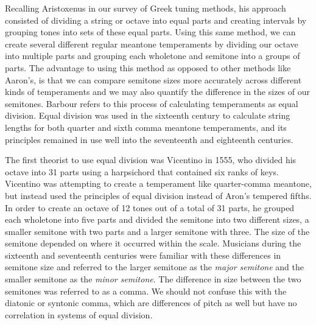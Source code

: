 Recalling Aristoxenus in our survey of Greek tuning methods, his approach consisted of
dividing a string or octave into equal parts and creating intervals by grouping tones into
sets of these equal parts. Using this same method, we can create several different regular
meantone temperaments by dividing our octave into multiple parts and grouping each
wholetone and semitone into a groups of parts. The advantage to using this method as
opposed to other methods like Aaron's, is that we can compare semitone sizes more
accurately across different kinds of temperaments and we may also quantify the difference
in the sizes of our semitones. Barbour refers to this process of calculating temperaments
as equal division. Equal division was used in the sixteenth century to calculate string
lengths for both quarter and sixth comma meantone temperaments, and its principles
remained in use well into the seventeenth and eighteenth centuries.

The first theorist to use equal division was Vicentino in 1555, who divided his octave
into 31 parts using a harpsichord that contained six ranks of keys. Vicentino was
attempting to create a temperament like quarter-comma meantone, but instead used the
principles of equal division instead of Aron's tempered fifths. In order to create an
octave of 12 tones out of a total of 31 parts, he grouped each wholetone into five
parts and divided the semitone into two different sizes, a smaller semitone with two
parts and a larger semitone with three.  The size of the semitone depended on where it
occurred within the scale. Musicians during the sixteenth and seventeenth centuries
were familiar with these differences in semitone size and referred to the larger
semitone as the \textit{major semitone} and the smaller semitone as the \textit{minor
semitone}.  The difference in size between the two semitones was referred to as a
comma.  We should not confuse this with the diatonic or syntonic comma, which are
differences of pitch as well but have no correlation in systems of equal division.

